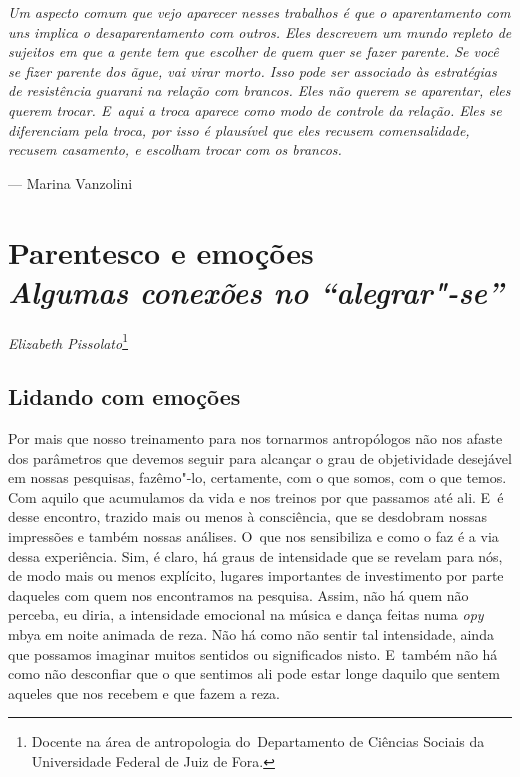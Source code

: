 \clearpage

\vspace*{\fill}

\begin{flushright}
\begin{minipage}[c]{0.85\textwidth}
\raggedleft
\footnotesize
\emph{Um aspecto comum que vejo aparecer nesses trabalhos é que o
aparentamento com uns implica o desaparentamento com outros. Eles
descrevem um mundo repleto de sujeitos em que a gente tem que escolher
de quem quer se fazer parente. Se você se fizer parente dos \emph{ãgue}, vai
virar morto. Isso pode ser associado às estratégias de resistência
guarani na relação com brancos. Eles não querem se aparentar, eles
querem trocar. E~aqui a troca aparece como modo de controle da relação.
Eles se diferenciam pela troca, por isso é plausível que eles recusem
comensalidade, recusem casamento, e escolham trocar com os brancos.}

\smallskip
\hspace*{\fill}--- Marina Vanzolini
\end{minipage}
\end{flushright}

\thispagestyle{empty}

\chapter*{Parentesco e emoções\\
\large{\emph{Algumas conexões no ``alegrar"-se''}}}


\begin{flushright}
\emph{Elizabeth Pissolato}\footnote{Docente na área de antropologia
do~Departamento de Ciências Sociais da Universidade Federal de Juiz de
Fora.}
\end{flushright}

\section{Lidando com emoções}

Por mais que nosso treinamento para nos tornarmos antropólogos não nos
afaste dos parâmetros que devemos seguir para alcançar o grau de
objetividade desejável em nossas pesquisas, fazêmo"-lo, certamente, com
o que somos, com o que temos. Com aquilo que acumulamos da vida e nos
treinos por que passamos até ali. E~é desse encontro, trazido mais ou
menos à consciência, que se desdobram nossas impressões e também nossas
análises. O~que nos sensibiliza e como o faz é a via dessa experiência.
Sim, é claro, há graus de intensidade que se revelam para nós, de modo
mais ou menos explícito, lugares importantes de investimento por parte
daqueles com quem nos encontramos na pesquisa. Assim, não há quem não
perceba, eu diria, a intensidade emocional na música e dança feitas
numa \emph{opy} mbya em noite animada de reza. Não há como não sentir tal
intensidade, ainda que possamos imaginar muitos sentidos ou
significados nisto. E~também não há como não desconfiar que o que
sentimos ali pode estar longe daquilo que sentem aqueles que nos
recebem e que fazem a reza.

